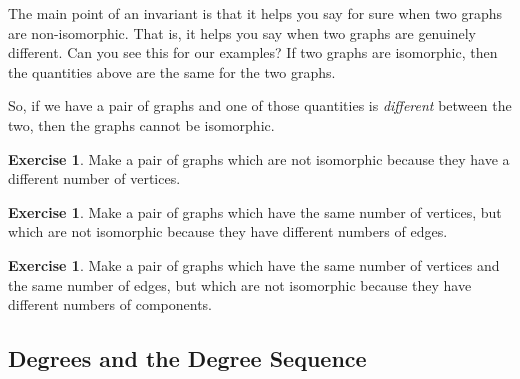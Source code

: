 \documentclass[12pt,letterpaper]{article}
\theoremstyle{definition}
\newtheorem{exercise}[question]{Exercise}
\begin{document}
The main point of an invariant is that it helps you say for sure when two graphs are non-isomorphic. That is, it helps you say when two graphs are genuinely different. Can you see this for our examples? If two graphs are isomorphic, then the quantities above are the same for the two graphs.

So, if we have a pair of graphs and one of those quantities is \textit{different} between the two, then the graphs
cannot be isomorphic.

\begin{exercise}
Make a pair of graphs which are not isomorphic because they have a different number of vertices.
\end{exercise}

\begin{exercise}
Make a pair of graphs which have the same number of vertices, but which are not isomorphic because they 
have different numbers of edges.
\end{exercise}

\begin{exercise}
Make a pair of graphs which have the same number of vertices and the same number of edges, but which are 
not isomorphic because they have different numbers of components.
\end{exercise}

\subsection*{Degrees and the Degree Sequence}
\end{document}
